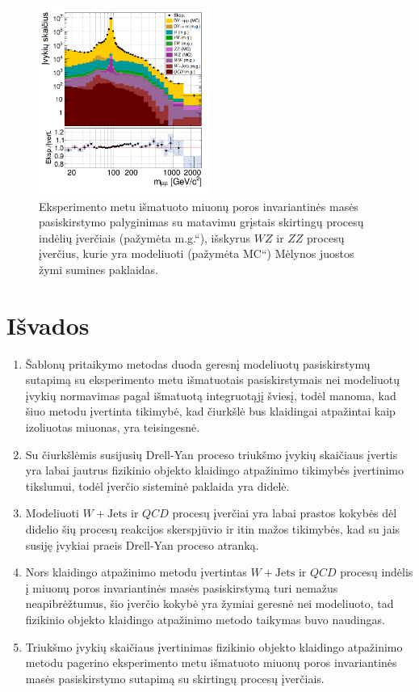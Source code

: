 \documentclass[a4paper, 12pt, oneside]{article}
\newcommand{\ZZ}{Z\! Z}
\newcommand{\WZ}{W\! Z}
\newcommand{\WJets}{W\! +\!\mathrm{Jets}}
\newcommand{\ltq}[1]{{\quotedblbase{}#1\textquotedblleft{}}}
\newcommand{\QCD}{QC\! D}
\newlength\q
\begin{document}
\begin{figure}[H]
	\includegraphics[width=0.5\textwidth]{Kursinis3/Mass_allEst.png}
	\vspace{-0.6cm}
	\caption{\label{fig:MassFinal}
		Eksperimento metu išmatuoto miuonų poros invariantinės masės pasiskirstymo palyginimas su matavimu grįstais
		skirtingų procesų indėlių įverčiais (pažymėta \ltq{m.g.}), išskyrus $\WZ$ ir $\ZZ$ procesų įverčius, kurie
		yra modeliuoti (pažymėta \ltq{MC}) Mėlynos juostos žymi sumines paklaidas.}
\end{figure}

\newpage
\section{Išvados}
\begin{enumerate}
	\item Šablonų pritaikymo metodas duoda geresnį modeliuotų pasiskirstymų sutapimą su eksperimento metu išmatuotais
	pasiskirstymais nei modeliuotų įvykių normavimas pagal išmatuotą integruotąjį šviesį, todėl manoma, kad šiuo metodu
	įvertinta tikimybė, kad čiurkšlė bus klaidingai atpažintai kaip izoliuotas miuonas, yra teisingesnė.
	\item Su čiurkšlėmis susijusių Drell-Yan proceso triukšmo įvykių skaičiaus įvertis yra labai jautrus
	fizikinio objekto klaidingo atpažinimo tikimybės įvertinimo tikslumui, todėl įverčio sisteminė paklaida yra didelė.
	\item Modeliuoti $\WJets$ ir $\QCD$ procesų įverčiai yra labai prastos kokybės dėl didelio šių procesų reakcijos
	skerspjūvio ir itin mažos tikimybės, kad su jais susiję įvykiai praeis Drell-Yan proceso atranką.
	\item Nors klaidingo atpažinimo metodu įvertintas $\WJets$ ir $\QCD$ procesų indėlis į miuonų poros invariantinės masės
	pasiskirstymą turi nemažus neapibrėžtumus, šio įverčio kokybė yra žymiai geresnė nei modeliuoto, tad fizikinio
	objekto klaidingo atpažinimo metodo taikymas buvo naudingas.
	\item Triukšmo įvykių skaičiaus įvertinimas fizikinio objekto klaidingo atpažinimo metodu pagerino eksperimento
	metu išmatuoto miuonų poros invariantinės masės pasiskirstymo sutapimą su skirtingų procesų įverčiais.
\end{enumerate}
\end{document}
